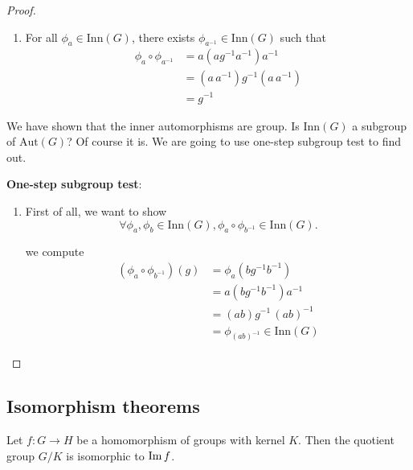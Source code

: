 \begin{proof}
\begin{enumerate}
         \item For all $\phi_a \in \text{Inn}(G)$, there exists $\phi_{a^{-1}} \in \text{Inn}(G)$ such that 
         \begin{align*}
             \phi_a \circ \phi_{a^{-1}} &= a(a g^{-1} a^{-1})a^{-1}\\
             &= (a\,a^{-1}) g^{-1} (a\,a^{-1})\\
             &= g^{-1}
         \end{align*}
     \end{enumerate}
 
     We have shown that the inner automorphisms are group. Is $\text{Inn}(G)$ a subgroup of $\text{Aut}(G)$? Of course it is. We 
     are going to use one-step subgroup test to find out.
 
     \textbf{One-step subgroup test}:
 
     \begin{enumerate}
         \item First of all, we want to show 
         \[
             \forall \phi_a, \phi_b \in \text{Inn}(G), \phi_a \circ \phi_{b^{-1}} \in \text{Inn}(G).
         \]
 
         we compute
         \begin{align*}
             (\phi_a \circ \phi_{b^{-1}})(g) &= \phi_a (b g^{-1}b^{-1})\\
             &= a(b g^{-1}b^{-1})a^{-1}\\
             &= (ab)g^{-1}\,(ab)^{-1}\\
             &= \phi_{(ab)^{-1}} \in \text{Inn}(G)
         \end{align*}
     \end{enumerate}
 \end{proof}

\subsection{Isomorphism theorems}

\begin{theorem}
    Let $f:G \to H$ be a homomorphism of groups with kernel $K$. Then the quotient group $G/K$ is 
    isomorphic to $\operatorname{Im} f$.
\end{theorem}

